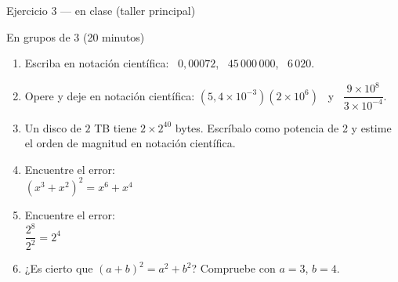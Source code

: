 \documentclass[aspectratio=169,10pt]{beamer}
\begin{document}
\begin{frame}{Ejercicio 3 — en clase (taller principal)}
  \begin{alertblock}{En grupos de 3 (20 minutos)}
    \tiny
    \begin{enumerate}\setlength{\itemsep}{0.04cm}
      \item Escriba en notación científica: \ $0{,}00072$, \ $45\,000\,000$, \
            $6\,020$.
      \item Opere y deje en notación científica:
            $(5{,}4\times 10^{-3})(2\times 10^{6})$ \ y \
            $\dfrac{9\times 10^{8}}{3\times 10^{-4}}$.
      \item Un disco de $2$ TB tiene $2\times 2^{40}$ bytes. Escríbalo como
            potencia de 2 y estime el orden de magnitud en notación científica.
      \item Encuentre el error: \\
            \hspace*{0.3cm} $\left(x^{3}+x^{2}\right)^{2} = x^{6}+x^{4}$
      \item Encuentre el error: \\
            \hspace*{0.3cm} $\dfrac{2^{8}}{2^{2}} = 2^{4}$
      \item ¿Es cierto que $(a+b)^{2} = a^{2}+b^{2}$? Compruebe con
            $a=3$, $b=4$.
    \end{enumerate}
  \end{alertblock}
\end{frame}
\end{document}
